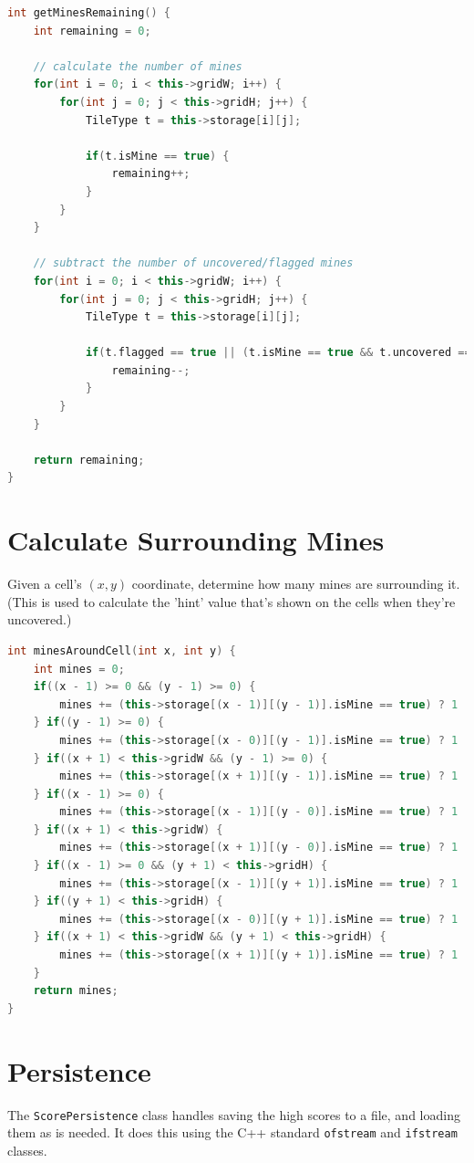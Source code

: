 \documentclass[11pt]{article}
\begin{document}
\begin{lstlisting}[frame=single,language=C++]
int getMinesRemaining() {
	int remaining = 0;

	// calculate the number of mines
	for(int i = 0; i < this->gridW; i++) {
		for(int j = 0; j < this->gridH; j++) {
			TileType t = this->storage[i][j];

			if(t.isMine == true) {
				remaining++;
			}
		}
	}

	// subtract the number of uncovered/flagged mines
	for(int i = 0; i < this->gridW; i++) {
		for(int j = 0; j < this->gridH; j++) {
			TileType t = this->storage[i][j];

			if(t.flagged == true || (t.isMine == true && t.uncovered == true)) {
				remaining--;
			}
		}
	}

	return remaining;
}
\end{lstlisting}

\section{Calculate Surrounding Mines}
Given a cell's $(x, y)$ coordinate, determine how many mines are surrounding it. (This is used to calculate the 'hint' value that's shown on the cells when they're uncovered.)

\begin{lstlisting}[frame=single,language=C++]
int minesAroundCell(int x, int y) {
	int mines = 0;
	if((x - 1) >= 0 && (y - 1) >= 0) {
		mines += (this->storage[(x - 1)][(y - 1)].isMine == true) ? 1 : 0;
	} if((y - 1) >= 0) {
		mines += (this->storage[(x - 0)][(y - 1)].isMine == true) ? 1 : 0;
	} if((x + 1) < this->gridW && (y - 1) >= 0) {
		mines += (this->storage[(x + 1)][(y - 1)].isMine == true) ? 1 : 0;
	} if((x - 1) >= 0) {
		mines += (this->storage[(x - 1)][(y - 0)].isMine == true) ? 1 : 0;
	} if((x + 1) < this->gridW) {
		mines += (this->storage[(x + 1)][(y - 0)].isMine == true) ? 1 : 0;
	} if((x - 1) >= 0 && (y + 1) < this->gridH) {
		mines += (this->storage[(x - 1)][(y + 1)].isMine == true) ? 1 : 0;
	} if((y + 1) < this->gridH) {
		mines += (this->storage[(x - 0)][(y + 1)].isMine == true) ? 1 : 0;
	} if((x + 1) < this->gridW && (y + 1) < this->gridH) {
		mines += (this->storage[(x + 1)][(y + 1)].isMine == true) ? 1 : 0;
	}
	return mines;
}
\end{lstlisting}

\section{Persistence}
The \texttt{ScorePersistence} class handles saving the high scores to a file, and loading them as is needed. It does this using the C++ standard \texttt{ofstream} and \texttt{ifstream} classes.
\end{document}
